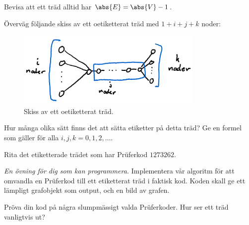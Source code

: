 \documentclass[nobib]{tufte-handout}
\begin{document}
\begin{xca}
    Bevisa att ett träd alltid har $\abs{E} = \abs{V} - 1$.
\end{xca}

\begin{xca}
    Överväg följande skiss av ett oetiketterat träd med $1 + i + j + k$ noder:
    \begin{figure}
        \centering
        \includegraphics[width=0.8\textwidth]{graphics/exercise_label_unlabelled_tree.png}
        \caption{Skiss av ett oetiketterat träd.}
    \end{figure}

    Hur många olika sätt finns det att sätta etiketter på detta träd? Ge en formel som gäller för alla $i, j, k = 0, 1, 2,\ldots$.
\end{xca}

\begin{xca}
    Rita det etiketterade trädet som har Prüferkod $1273262$.
\end{xca}

\begin{xca}
    \emph{En övning för dig som kan programmera.} Implementera vår algoritm för att omvandla en Prüferkod till ett etiketterat träd i faktisk kod. Koden skall ge ett lämpligt grafobjekt som output, och en bild av grafen.

    Pröva din kod på några slumpmässigt valda Prüferkoder. Hur ser ett träd vanligtvis ut?
\end{xca}
\end{document}

